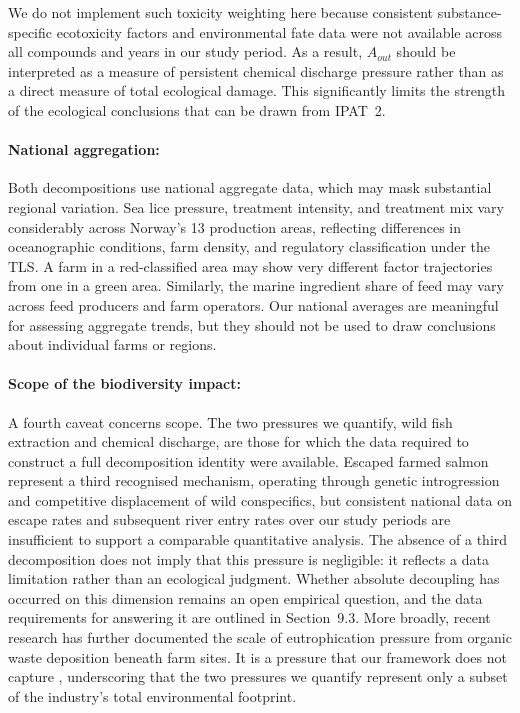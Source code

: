 \documentclass[12pt, a4paper]{report}
\begin{document}
We do not implement such toxicity weighting here because consistent
substance-specific ecotoxicity factors and environmental fate data
were not available across all compounds and years in our study period.
As a result, $A_{out}$ should be interpreted as a measure of persistent
chemical discharge pressure rather than as a direct measure of total
ecological damage. This significantly limits the strength of the
ecological conclusions that can be drawn from IPAT~2.

\paragraph{National aggregation:}
Both decompositions use national aggregate data, which may mask
substantial regional variation. Sea lice pressure, treatment intensity,
and treatment mix vary considerably across Norway's 13 production areas,
reflecting differences in oceanographic conditions, farm density, and
regulatory classification under the TLS. A farm in a red-classified
area may show very different factor trajectories from one in a green
area. Similarly, the marine ingredient share of feed may vary across
feed producers and farm operators. Our national averages are meaningful
for assessing aggregate trends, but they should not be used to draw
conclusions about individual farms or regions.


\paragraph{Scope of the biodiversity impact:}

A fourth caveat concerns scope. The two pressures we quantify, wild fish extraction and chemical discharge, are those for which the data required to construct a full decomposition identity were available. Escaped farmed salmon represent a third recognised mechanism, operating through genetic introgression and competitive displacement of wild conspecifics, but consistent national data on escape rates and subsequent river entry rates over our study periods are insufficient to support a comparable quantitative analysis. The absence of a third decomposition does not imply that this pressure is negligible: it reflects a data limitation rather than an ecological judgment. Whether absolute decoupling has occurred on this dimension remains an open empirical question, and the data requirements for answering it are outlined in Section~9.3. More broadly, recent research has further documented the scale of eutrophication pressure from organic waste deposition beneath farm sites. It is a pressure that our framework does not capture \citep{sunstone2026, guardian2026}, underscoring that the two pressures we quantify represent only a subset of the industry's total environmental footprint.
\end{document}
